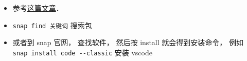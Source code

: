 
\begin{itemize}
\item 参考\href{https://www.howtogeek.com/660193/how-to-work-with-snap-packages-on-linux/}{这篇文章}．
\item \verb|snap find 关键词| 搜索包
\item 或者到 snap 官网， 查找软件， 然后按 install 就会得到安装命令， 例如 \verb|snap install code --classic| 安装 vscode
\end{itemize}

